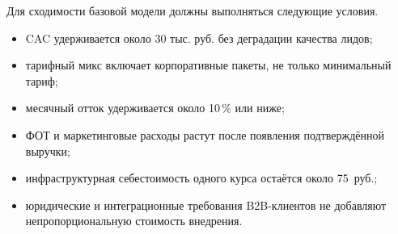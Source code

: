 Для сходимости базовой модели должны выполняться следующие условия.
\begin{itemize}
  \item CAC удерживается около 30 тыс. руб. без деградации качества лидов;
  \item тарифный микс включает корпоративные пакеты, не только минимальный тариф;
  \item месячный отток удерживается около 10\,\% или ниже;
  \item ФОТ и маркетинговые расходы растут после появления подтверждённой выручки;
  \item инфраструктурная себестоимость одного курса остаётся около 75~руб.;
  \item юридические и интеграционные требования B2B-клиентов не добавляют
    непропорциональную стоимость внедрения.
\end{itemize}
